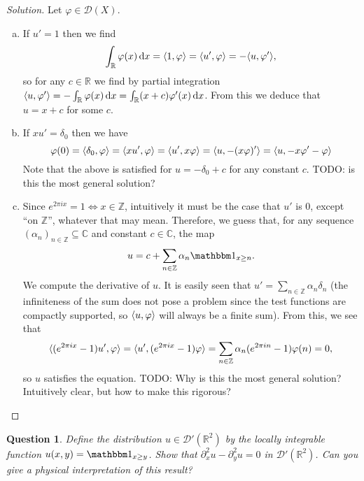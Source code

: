 \documentclass{article}
\theoremstyle{plain}
\newtheorem{question}{Question}
\theoremstyle{remark}
\newenvironment{solution}{\begin{proof}[Solution]\renewcommand\qedsymbol{}}{\end{proof}}
\renewcommand{\phi}{\varphi}
\newcommand{\Bb}{\mathbb}
\newcommand{\Cal}{\mathcal}
\newcommand{\CC}{\Bb C}
\newcommand{\RR}{\Bb R}
\newcommand{\DD}{\Cal D}
\newcommand\ZZ{\Bb Z}
\DeclarePairedDelimiter{\ang}{\langle}{\rangle}
\newcommand\ind{\mathbbm 1} %
\newcommand\TODO{{\color{red} TODO: }}
\newcommand\pt\partial
\begin{document}
\begin{solution}
	Let $\phi \in \DD(X)$. 
	\begin{enumerate}[(a)]
		\item If $u' = 1$ then we find 
		\[
		\int_\RR \phi(x) \dd{x} = \ang{1, \phi} = \ang{u', \phi} = -\ang{u, \phi'},
		\]
		so for any $c \in \RR$ we find by partial integration $\ang{u, \phi'} = - \int_\RR\phi(x) \dd{x} = \int_\RR (x + c) \phi'(x) \dd{x}$. From this we deduce that $u = x + c$ for some $c$. 
		
		\item If $xu' = \delta_0$ then we have
		\[
		\phi(0) = \ang{\delta_0, \phi} = \ang{xu', \phi} = \ang{u', x\phi} = \ang{u, -(x\phi)'} = \ang{u, -x\phi' - \phi} %
		\]
		Note that the above is satisfied for $u = - \delta_0 + c$ for any constant $c$. \TODO is this the most general solution?
		
		\item Since $e^{2\pi i x} = 1 \iff x \in \ZZ$, intuitively it must be the case that $u'$ is 0, except ``on $\ZZ$'', whatever that may mean. Therefore, we guess that, for any sequence $(\alpha_n)_{n \in \ZZ} \subseteq \CC$ and constant $c \in \CC$, the map \[u = c + \sum_{n \in \ZZ} \alpha_n \ind_{x \geq n}.\] We compute the derivative of $u$. It is easily seen that $u' = \sum_{n \in \ZZ} \alpha_n \delta_n$ (the infiniteness of the sum does not pose a problem since the test functions are compactly supported, so $\ang{u, \phi}$ will always be a finite sum). 
From this, we see that
	\[
	\ang{(e^{2\pi i x} - 1) u', \phi} = \ang{u', (e^{2\pi i x} -1 )\phi} = \sum_{n \in \ZZ} \alpha_n (e^{2\pi i n} - 1) \phi(n) = 0,
	\]
	so $u$ satisfies the equation. \TODO Why is this the most general solution? Intuitively clear, but how to make this rigorous?
	\end{enumerate}
\end{solution}

\begin{question}
	Define the distribution $u \in \DD'(\RR^2)$ by the locally integrable function $u(x, y) = \ind_{x \geq y}$. Show that $\pt_x^2   u - \pt_y^2 u = 0$ in $\DD'(\RR^2)$. Can you give a physical interpretation of this result?
\end{question}
\end{document}
